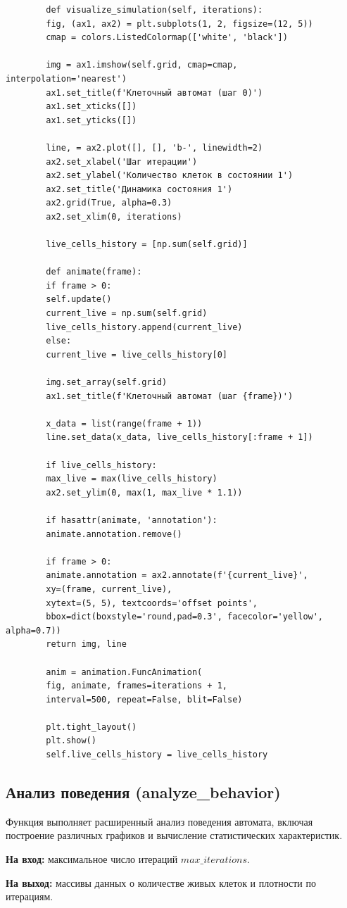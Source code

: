 \documentclass[11pt,a4paper,final]{article}
\begin{document}
	\begin{verbatim}
		def visualize_simulation(self, iterations):
		fig, (ax1, ax2) = plt.subplots(1, 2, figsize=(12, 5))
		cmap = colors.ListedColormap(['white', 'black'])
		
		img = ax1.imshow(self.grid, cmap=cmap, interpolation='nearest')
		ax1.set_title(f'Клеточный автомат (шаг 0)')
		ax1.set_xticks([])
		ax1.set_yticks([])
		
		line, = ax2.plot([], [], 'b-', linewidth=2)
		ax2.set_xlabel('Шаг итерации')
		ax2.set_ylabel('Количество клеток в состоянии 1')
		ax2.set_title('Динамика состояния 1')
		ax2.grid(True, alpha=0.3)
		ax2.set_xlim(0, iterations)
		
		live_cells_history = [np.sum(self.grid)]
		
		def animate(frame):
		if frame > 0:
		self.update()
		current_live = np.sum(self.grid)
		live_cells_history.append(current_live)
		else:
		current_live = live_cells_history[0]
		
		img.set_array(self.grid)
		ax1.set_title(f'Клеточный автомат (шаг {frame})')
		
		x_data = list(range(frame + 1))
		line.set_data(x_data, live_cells_history[:frame + 1])
		
		if live_cells_history:
		max_live = max(live_cells_history)
		ax2.set_ylim(0, max(1, max_live * 1.1))
		
		if hasattr(animate, 'annotation'):
		animate.annotation.remove()
		
		if frame > 0:
		animate.annotation = ax2.annotate(f'{current_live}',
		xy=(frame, current_live),
		xytext=(5, 5), textcoords='offset points',
		bbox=dict(boxstyle='round,pad=0.3', facecolor='yellow', alpha=0.7))		
		return img, line
		
		anim = animation.FuncAnimation(
		fig, animate, frames=iterations + 1,
		interval=500, repeat=False, blit=False)
		
		plt.tight_layout()
		plt.show()		
		self.live_cells_history = live_cells_history
	\end{verbatim}
	
	\subsection{Анализ поведения (analyze\_behavior)}
	
	Функция выполняет расширенный анализ поведения автомата, включая построение различных графиков и вычисление статистических характеристик.
	
	\textbf{На вход:} максимальное число итераций $max\_iterations$.  
	\par \textbf{На выход:} массивы данных о количестве живых клеток и плотности по итерациям.
	
\end{document}
